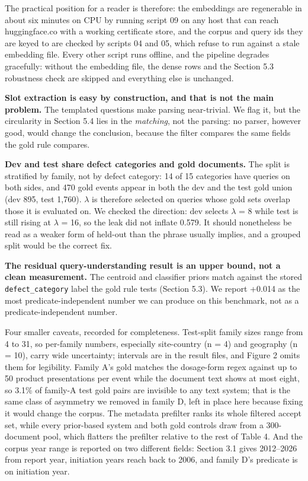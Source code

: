 \documentclass[acmsmall]{acmart}
\begin{document}
The practical position for a reader is therefore: the embeddings are regenerable in about six minutes on CPU by running script 09 on any host that can reach huggingface.co with a working certificate store, and the corpus and query ids they are keyed to are checked by scripts 04 and 05, which refuse to run against a stale embedding file. Every other script runs offline, and the pipeline degrades gracefully: without the embedding file, the dense rows and the Section 5.3 robustness check are skipped and everything else is unchanged.

\textbf{Slot extraction is easy by construction, and that is not the main problem.} The templated questions make parsing near-trivial. We flag it, but the circularity in Section 5.4 lies in the \textit{matching}, not the parsing: no parser, however good, would change the conclusion, because the filter compares the same fields the gold rule compares.

\textbf{Dev and test share defect categories and gold documents.} The split is stratified by family, not by defect category: 14 of 15 categories have queries on both sides, and 470 gold events appear in both the dev and the test gold union (dev 895, test 1,760). $\lambda$ is therefore selected on queries whose gold sets overlap those it is evaluated on. We checked the direction: dev selects $\lambda$ = 8 while test is still rising at $\lambda$ = 16, so the leak did not inflate 0.579. It should nonetheless be read as a weaker form of held-out than the phrase usually implies, and a grouped split would be the correct fix.

\textbf{The residual query-understanding result is an upper bound, not a clean measurement.} The centroid and classifier priors match against the stored \texttt{defect\_category} label the gold rule tests (Section 5.3). We report +0.014 as the most predicate-independent number we can produce on this benchmark, not as a predicate-independent number.

Four smaller caveats, recorded for completeness. Test-split family sizes range from 4 to 31, so per-family numbers, especially site-country (n = 4) and geography (n = 10), carry wide uncertainty; intervals are in the result files, and Figure 2 omits them for legibility. Family A's gold matches the dosage-form regex against up to 50 product presentations per event while the document text shows at most eight, so 3.1\% of family-A test gold pairs are invisible to any text system; that is the same class of asymmetry we removed in family D, left in place here because fixing it would change the corpus. The metadata prefilter ranks its whole filtered accept set, while every prior-based system and both gold controls draw from a 300-document pool, which flatters the prefilter relative to the rest of Table 4. And the corpus year range is reported on two different fields: Section 3.1 gives 2012--2026 from report year, initiation years reach back to 2006, and family D's predicate is on initiation year.
\end{document}
